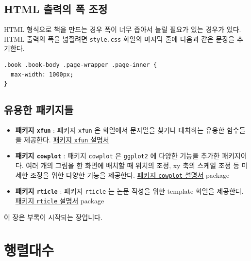 \documentclass[
]{book}
\theoremstyle{definition}
\theoremstyle{definition}
\theoremstyle{definition}
\theoremstyle{definition}
\theoremstyle{remark}
\begin{document}
\hypertarget{html-uxcd9cuxb825uxc758-uxd3ed-uxc870uxc815}{%
\section{HTML 출력의 폭 조정}\label{html-uxcd9cuxb825uxc758-uxd3ed-uxc870uxc815}}

HTML 형식으로 책을 만드는 경우 폭이 너무 좁아서 늘릴 필요가 있는 경우가 있다. HTML 출력의 폭을 넓힐려면 \texttt{style.css} 화일의 마지막 줄에 다음과 같은 문장을 추기한다.

\begin{verbatim}
.book .book-body .page-wrapper .page-inner {
  max-width: 1000px;
}
\end{verbatim}

\hypertarget{uxc720uxc6a9uxd55c-uxd328uxd0a4uxc9c0uxb4e4}{%
\section{유용한 패키지들}\label{uxc720uxc6a9uxd55c-uxd328uxd0a4uxc9c0uxb4e4}}

\begin{itemize}
\item
  \textbf{패키지 \texttt{xfun}} : 패키지 \texttt{xfun} 은 화일에서 문자열을 찾거나 대치하는 유용한 함수들을 제공한다.
  \href{https://cran.r-project.org/web/packages/xfun/vignettes/xfun.html}{패키지 \texttt{xfun} 설명서}
\item
  \textbf{패키지 \texttt{cowplot}} : 패키지 \texttt{cowplot} 은 \texttt{ggplot2} 에 다양한 기능을 추가한 패키지이다. 여러 개의 그림을 한 화면에 배치할 때 위치의 조정, xy 축의 스케일 조정 등 미세한 조정을 위한 다양한 기능을 제공한다. \href{https://wilkelab.org/cowplot/index.html}{패키지 \texttt{cowplot} 설명서} package
\item
  \textbf{패키지 \texttt{rticle}} : 패키지 \texttt{rticle} 는 논문 작성을 위한 template 화일을 제공한다. \href{https://github.com/rstudio/rticles}{패키지 \texttt{rticle} 설명서} package
\end{itemize}

\hypertarget{appendix-appendix}{%
\appendix {}}


이 장은 부록이 시작되는 장입니다.

\hypertarget{appmatrix}{%
\chapter{행렬대수}\label{appmatrix}}
\end{document}
